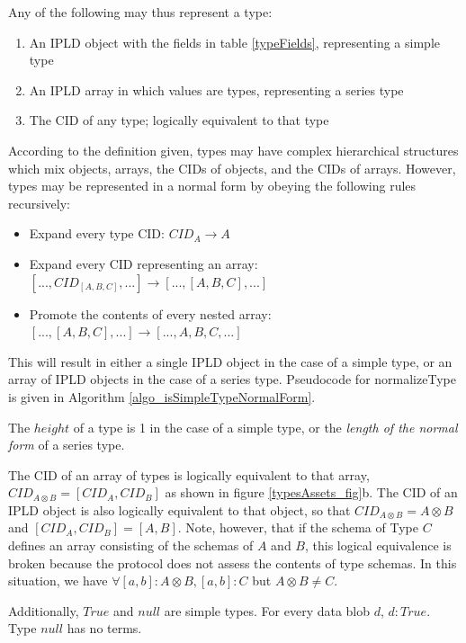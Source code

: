 \documentclass[9pt, oneside]{article}   	%
\begin{document}
\begin{multicols}{2}

Any of the following may thus represent a type:
\begin{enumerate}
\item An IPLD object with the fields in table \ref{typeFields}, representing a simple type
\item An IPLD array in which values are types, representing a series type
\item The CID of any type; logically equivalent to that type
\end{enumerate}


According to the definition given, types may have complex hierarchical structures which mix objects, arrays, the CIDs of objects, and the CIDs of arrays. However, types may be represented in a normal form by obeying the following rules recursively:

\begin{itemize}
\item Expand every type CID: $CID_A \rightarrow A$
\item Expand every CID representing an array: $[..., CID_{[A,B,C]}, ...] \rightarrow [..., [A,B,C], ...]$
\item Promote the contents of every nested array: $ [..., [A,B,C], ...] \rightarrow [..., A,B,C, ...]$
\end{itemize}

This will result in either a single IPLD object in the case of a simple type, or an array of IPLD objects in the case of a series type. Pseudocode for normalizeType is given in Algorithm \ref{algo_isSimpleTypeNormalForm}.

The $height$ of a type is 1 in the case of a simple type, or the \textit{length of the normal form} of a series type.

The CID of an array of types is logically equivalent to that array, $CID_{A \otimes B} = [CID_A, CID_B]$ as shown in figure \ref{typesAssets_fig}b. The CID of an IPLD object is also logically equivalent to that object, so that $CID_{A \otimes B} = A \otimes B$ and $[CID_A, CID_B] = [A,B]$. Note, however, that  if the schema of Type $C$ defines an array consisting of the schemas of $A$ and $B$, this logical equivalence is broken because the protocol does not assess the contents of type schemas. In this situation, we have $\forall [a,b] : A\otimes B,  [a,b] : C$ but $ A\otimes B \neq C$.

Additionally, $True$ and $null$ are simple types. For every data blob $d$, $d : True$. Type $null$ has no terms.


\end{multicols}
\end{document}

